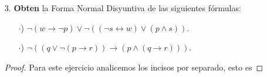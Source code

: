 \documentclass{article}
\begin{document}
\begin{itemize}
\begin{proof}
    2. Pasando a FNC por medio de equivalencias lógicas a la función
    $\phi = \neg p \land q \rightarrow p \land (r \rightarrow q)$,
    tenemos que
    \begin{eqnarray*}
      \phi &\equiv& \neg (\neg p \land q) \lor (p \land (\neg r \lor q))
      \hspace*{2cm} \text{Eliminación de la implicación.}\\
      &\equiv& (p \lor \neg q) \lor (p \land \neg r) \lor (p \land q)
      \hspace*{1cm} \text{Leyes de De Morgan y distributividad.}\\
      &\equiv& p \lor (p \land \neg r) \lor \neg q \lor (p \land q)
      \hspace*{2.5cm} \text{Conmutatividad de } \lor.\\
      &\equiv& ((p \lor p) \land (p \lor \neg r)) \lor ((\neg q \lor q) \land (p \lor \neg q))
      \hspace*{0.7cm} \text{Distributividad.}\\
      &\equiv& (p \land (p \lor \neg r)) \lor (\top \land (p \lor \neg q))
      \hspace*{1.5cm} \text{Idempotencia y $3^{\text{ro}}$ excluido.}\\
      &\equiv&  p \lor (p \lor \neg q)
      \hspace*{4.2cm} \text{Neutro conjuntivo y absorción.}\\
      &\equiv& p
      \hspace*{7.5cm} \text{Absorción.}
    \end{eqnarray*}
    \[\therefore\;\;  \phi \equiv p\]
  \end{proof}
\newpage
\item[3.] \textbf{Obten} la Forma Normal Disyuntiva de las siguientes fórmulas:
  \begin{itemize}
  \item[$\cdot$)] $\neg(w \rightarrow \neg p) \lor \neg ((\neg s \leftrightarrow w) \lor (p \land s)).$
  \item[$\cdot$)] $\neg((q \lor \neg (p \rightarrow r)) \rightarrow (p \land (q \rightarrow r))).$
  \end{itemize}
  \begin{proof} Para este ejercicio analicemos los incisos por separado, esto es
    

\end{proof}
\end{itemize}
\end{document}
